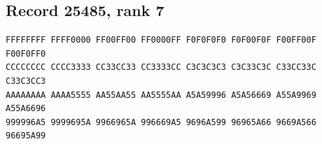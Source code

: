 \documentclass[11pt]{amsart}
\theoremstyle{definition}
\theoremstyle{remark}
\numberwithin{equation}{section}
\numberwithin{table}{section}
\begin{document}
\subsection*{Record 25485, rank 7}
\begin{Verbatim}[fontsize=\scriptsize,xleftmargin=1em]
FFFFFFFF FFFF0000 FF00FF00 FF0000FF F0F0F0F0 F0F00F0F F00FF00F F00F0FF0
CCCCCCCC CCCC3333 CC33CC33 CC3333CC C3C3C3C3 C3C33C3C C33CC33C C33C3CC3
AAAAAAAA AAAA5555 AA55AA55 AA5555AA A5A59996 A5A56669 A55A9969 A55A6696
999996A5 9999695A 9966965A 996669A5 9696A599 96965A66 9669A566 96695A99
\end{Verbatim}
\par
{}\par
\end{document}
